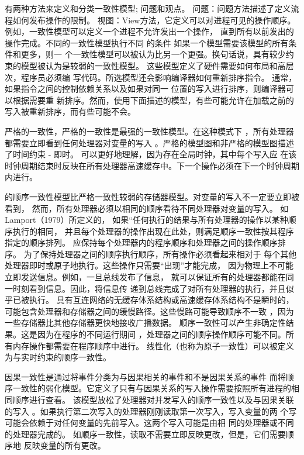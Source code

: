 有两种方法来定义和分类一致性模型; 问题和观点。
问题：问题方法描述了定义流程如何发布操作的限制。
视图：View方法，它定义可以对进程可见的操作顺序。
例如，一致性模型可以定义一个进程不允许发出一个操作，
直到所有以前发出的操作完成。不同的一致性模型执行不同
的条件 如果一个模型需要该模型的所有条件和更多，则一
个一致性模型可以被认为比另一个更强。换句话说，具有较少约束的模型被认为是较弱的一致性模型。
这些模型定义了硬件需要如何布局和高层次，程序员必须编
写代码。所选模型还会影响编译器如何重新排序指令。
通常，如果指令之间的控制依赖关系以及如果对同一
位置的写入进行排序，则编译器可以根据需要重
新排序。然而，使用下面描述的模型，有些可能允许在加载之前的写入被重新排序，而有些可能不会。

严格的一致性，严格的一致性是最强的一致性模型。在这种模式下
，所有处理器都需要立即看到任何处理器对变量的写入
。严格的模型图和非严格的模型图描述了时间约束 - 即时。
可以更好地理解，因为存在全局时钟，其中每个写入应
在该时钟周期结束时反映在所有处理器高速缓存中。下一个操作必须在下一个时钟周期内进行。

的顺序一致性模型比严格一致性较弱的存储器模型。对变量的写入不一定要立即被看到，
然而，所有处理器必须以相同的顺序看待不同处理器对变量的写入。
如Lamport（1979）所定义的，
如果“任何执行的结果与所有处理器的操作以某种顺序执行的相同，
并且每个处理器的操作出现在此处，则满足顺序一致性按其程序指定的顺序排列。
应保持每个处理器内的程序顺序和处理器之间的操作顺序排序。
为了保持处理器之间的顺序执行顺序，所有操作必须看起来相对于
每个其他处理器即时或原子地执行。这些操作只需要“出现”才能完成，
因为物理上不可能立即发送信息。例如，一旦总线发布了信息，
就可以保证所有的处理器都能在同一时刻看到信息。因此，将信息传
递到总线完成了对所有处理器的执行，并且似乎已被执行。
具有互连网络的无缓存体系结构或高速缓存体系结构不是瞬时的，
可能包含处理器和存储器之间的缓慢路径。这些慢路可能导致顺序不一致
，因为一些存储器比其他存储器更快地接收广播数据。
顺序一致性可以产生非确定性结果。这是因为在程序的不同运行期间
，处理器之间的顺序操作顺序可能不同。所有内存操作都需要在程序顺序中进行。
线性化（也称为原子一致性）可以被定义为与实时约束的顺序一致性。

因果一致性是通过将事件分类为与因果相关的事件和不是因果关系的事件
而将顺序一致性的弱化模型。它定义了只有与因果关系的写入操作需要按照所有进程的相同顺序进行查看。
该模型放松了处理器对并发写入的顺序一致性以及与因果关联的写入
。如果执行第二次写入的处理器刚刚读取第一次写入，写入变量的两
个写可能会依赖于对任何变量的先前写入。这两个写入可能是由相
同的处理器或不同的处理器完成的。
如顺序一致性，读取不需要立即反映更改，但是，它们需要顺序地
反映变量的所有更改。

